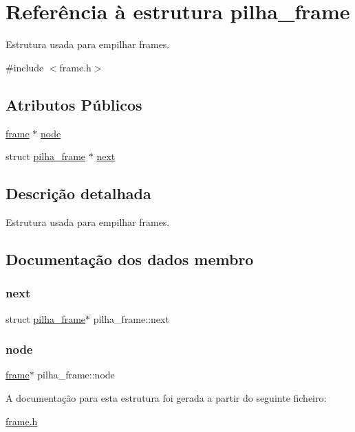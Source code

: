 \hypertarget{structpilha__frame}{}\section{Referência à estrutura pilha\+\_\+frame}
\label{structpilha__frame}


Estrutura usada para empilhar frames.  




{\ttfamily \#include $<$frame.\+h$>$}

\subsection*{Atributos Públicos}
\begin{DoxyCompactItemize}
\item 
\hyperlink{structframe}{frame} $\ast$ \hyperlink{structpilha__frame_a5a31286df879b1de7e889276dcd7d4b4}{node}
\item 
struct \hyperlink{structpilha__frame}{pilha\+\_\+frame} $\ast$ \hyperlink{structpilha__frame_ad0004696fa5330d79837646ad73a2dd1}{next}
\end{DoxyCompactItemize}


\subsection{Descrição detalhada}
Estrutura usada para empilhar frames. 

\subsection{Documentação dos dados membro}
\mbox{\label{structpilha__frame_ad0004696fa5330d79837646ad73a2dd1}} 
\subsubsection{\texorpdfstring{next}{next}}
{\footnotesize\ttfamily struct \hyperlink{structpilha__frame}{pilha\+\_\+frame}$\ast$ pilha\+\_\+frame\+::next}

\mbox{\label{structpilha__frame_a5a31286df879b1de7e889276dcd7d4b4}} 
\subsubsection{\texorpdfstring{node}{node}}
{\footnotesize\ttfamily \hyperlink{structframe}{frame}$\ast$ pilha\+\_\+frame\+::node}



A documentação para esta estrutura foi gerada a partir do seguinte ficheiro\+:\begin{DoxyCompactItemize}
\item 
\hyperlink{frame_8h}{frame.\+h}\end{DoxyCompactItemize}
